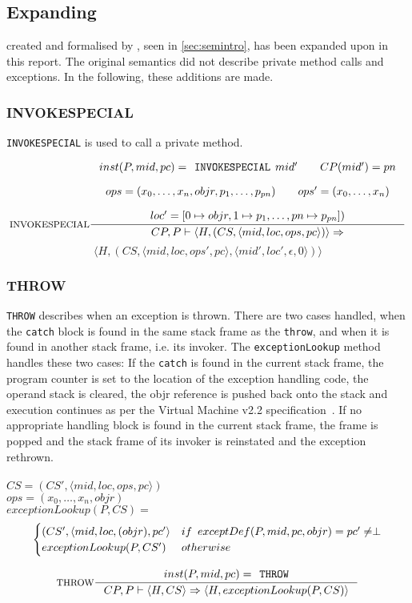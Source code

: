 \subsection{Expanding \jcl}
\jcl created and formalised by \cite{javasec}, seen in \cref{sec:semintro}, has been expanded upon in this report. The original semantics did not describe private method calls and exceptions. In the following, these additions are made.

\subsubsection{INVOKESPECIAL}
\texttt{INVOKESPECIAL} is used to call a private method.

$$\inference[INVOKESPECIAL]{
inst(P,mid,pc) = \texttt{INVOKESPECIAL }mid' \semsp 
CP(mid') = pn \semnl \\
ops = (x_0, \ldots, x_n, objr, p_1, \ldots, p_{pn}) \semsp
ops' = (x_0, \ldots, x_{n}) \semnl\\
loc' = [0 \mapsto objr, 1 \mapsto p_{1}, \ldots, pn \mapsto p_{pn}])}
{CP, P \vdash \langle H, (CS, \langle mid, loc, ops, pc \rangle)\rangle \Rightarrow }$$
$$\langle H, (CS, \langle mid, loc, ops', pc \rangle, \langle mid', loc', \epsilon, 0 \rangle)\rangle$$


\subsubsection{THROW}
\texttt{THROW} describes when an exception is thrown. There are two cases handled, when the \texttt{catch} block is found in the same stack frame as the \texttt{throw}, and when it is found in another stack frame, i.e. its invoker. The \texttt{exceptionLookup} method handles these two cases: If the \texttt{catch} is found in the current stack frame, the program counter is set to the location of the exception handling code, the operand stack is cleared, the objr reference is pushed back onto the stack and execution continues as per the \jc Virtual Machine v2.2 specification~\cite[JcvmSpec p. 151]{jcvm}. If no appropriate handling block is found in the current stack frame, the frame is popped and the stack frame of its invoker is reinstated and the exception rethrown.\\~\\

$CS = (CS', \langle mid, loc, ops, pc \rangle)$ \\ 
$ops = (x_0, \ldots, x_n, objr)$\vspace{5px} \\
$exceptionLookup(P, CS) = $ \vspace{-10px} \\
\[
\begin{cases}
  (CS', \langle mid, loc, (objr), pc' \rangle  & if \hspace{5px} exceptDef(P, mid, pc, objr) = pc' \neq \perp\\
  exceptionLookup(P, CS') & otherwise
\end{cases}
\]

$$\inference[THROW]{
inst(P,mid,pc) = \texttt{THROW} }
{CP, P \vdash \langle H, CS \rangle \Rightarrow \langle H, exceptionLookup(P,CS)\rangle}$$
